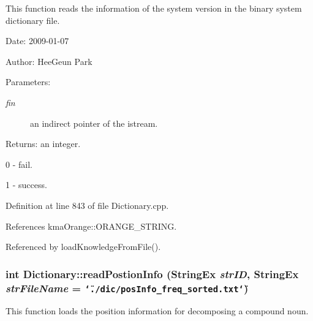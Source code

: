 This function reads the information of the system version in the binary system dictionary file. 

\begin{Desc}
\item[Date:]2009-01-07 \end{Desc}
\begin{Desc}
\item[Author:]HeeGeun Park \end{Desc}
\begin{Desc}
\item[Parameters:]
\begin{description}
\item[{\em fin}]an indirect pointer of the istream. \end{description}
\end{Desc}
\begin{Desc}
\item[Returns:]an integer.\par
 0 - fail.\par
 1 - success. \end{Desc}


Definition at line 843 of file Dictionary.cpp.

References kmaOrange::ORANGE\_\-STRING.

Referenced by loadKnowledgeFromFile().\hypertarget{classkmaOrange_1_1Dictionary_676d4f45dcfe21f931a65e94b8f3467e}{
\subsubsection[{readPostionInfo}]{\setlength{\rightskip}{0pt plus 5cm}int Dictionary::readPostionInfo ({\bf StringEx} {\em strID}, \/  {\bf StringEx} {\em strFileName} = {\tt \char`\"{}./dic/posInfo\_\-freq\_\-sorted.txt\char`\"{}})}}
\label{classkmaOrange_1_1Dictionary_676d4f45dcfe21f931a65e94b8f3467e}


This function loads the position information for decomposing a compound noun. 

